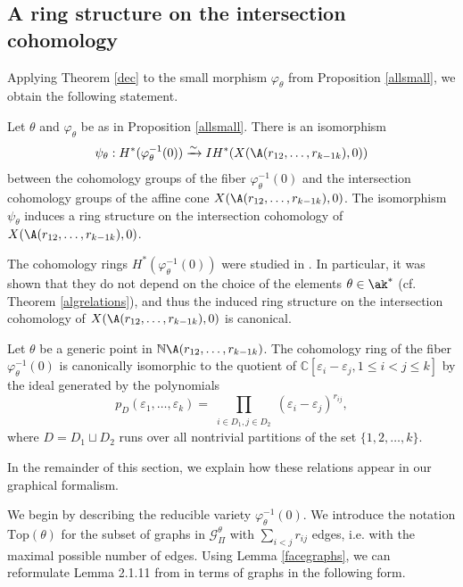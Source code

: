 \subsection{A ring structure on the intersection cohomology}
Applying Theorem \ref{dec} to the small morphism $\varphi_\theta$ from 
Proposition \ref{allsmall}, we obtain the following statement.
\begin{coro}\label{psi}
	Let $\theta$ and $\varphi_\theta$ be as in Proposition \ref{allsmall}. 
	There is an isomorphism 
	$$\psi_\theta: H^*(\varphi_\theta^{-1}(0)) \xrightarrow{\sim} IH^*(X(\A(r_{12}, \ldots ,r_{k-1 
	k}),0))$$
	between the cohomology groups of the fiber $\varphi_\theta^{-1}(0)$ and the 
	intersection cohomology groups of the affine cone $X(\A(r_{12}, \ldots ,r_{k-1 
	k}),0)$.
	The isomorphism $\psi_\theta$ induces a ring structure on the intersection 
	cohomology of $X(\A(r_{12}, \ldots ,r_{k-1 k}),0)$.
	\end{coro}


The cohomology rings $H^*(\varphi_\theta^{-1}(0))$ were studied in \cite{HSt}. 
In particular, it was shown that they do not depend on the choice of the 
elements $\theta\in\ak^*$ (cf.  Theorem \ref{algrelations}), and thus the 
induced ring structure on the intersection cohomology of  
$X(\A(r_{12}, \ldots ,r_{k-1 k}),0)$ is canonical.

\begin{theorem}\label{algrelations}
	Let $\theta$ be a generic point in $\mathbb{N}\A(r_{12}, \ldots ,r_{k-1 k})$. 
	The cohomology ring of the fiber $\varphi_\theta^{-1}(0)$ is canonically 
	isomorphic to the quotient of 
	$\mathbb{C}[\varepsilon_i-\varepsilon_j, 1\leq i<j\leq k]$ by the ideal 
	generated by the polynomials 
\begin{equation}\label{HStrelations}
		p_{D}(\varepsilon_1,\dots,\varepsilon_k)=\prod_{\substack{i\in 
		D_1, j\in D_2}}(\varepsilon_i-\varepsilon_j)^{r_{ij}},
\end{equation} where $D=D_1\sqcup 
			D_2$ runs 
	over all nontrivial partitions of the set $\{1,2, \ldots ,k\}$. 
\end{theorem}

In the remainder of this section, we explain how these relations appear in our 
graphical formalism.

We begin by describing the reducible variety $\varphi_\theta^{-1}(0)$.  
We introduce the notation $\mathrm{Top}(\theta)$ for the subset of graphs in 
$\mathcal{G}^{\theta}_\Pi$ with $\sum_{i<j}r_{ij}$ edges, i.e.  with the maximal 
possible number of edges. Using Lemma 
\ref{facegraphs}, we can reformulate Lemma 2.1.11 from \cite{Yau} in terms of 
graphs in the following form.

